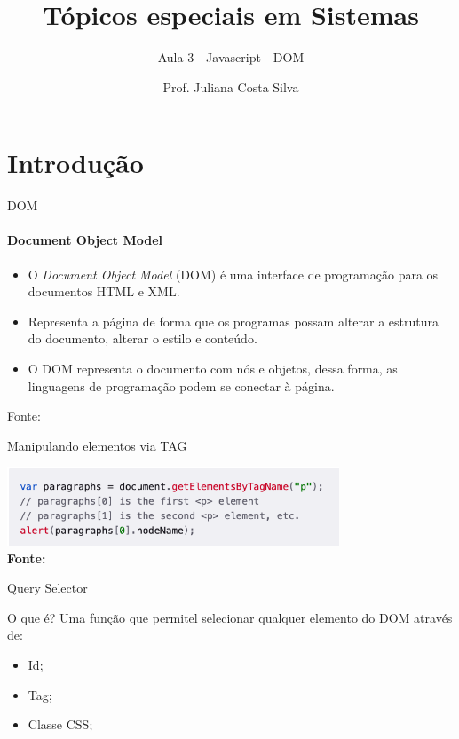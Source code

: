 \documentclass{beamer}
\title{Tópicos especiais em Sistemas}
\subtitle{Aula 3  - Javascript - DOM}
\author{Prof. Juliana Costa Silva}
\begin{document}
  \frame[c]{\maketitle}
    \section{Introdução}
    \begin{frame}{DOM}
      \framesubtitle{Document Object Model}%
      
      \begin{itemize}
            \item O \textit{Document Object Model} (DOM) é uma interface de programação para os documentos HTML e XML.
            \item Representa a página de forma que os programas possam alterar a estrutura do documento, alterar o estilo e conteúdo. 
            \item O DOM representa o documento com nós e objetos, dessa forma, as linguagens de programação podem se conectar à página.
       \end{itemize}
       \tiny{Fonte: \cite{moziladev2022}}
     \end{frame}
\begin{frame}{Manipulando elementos via TAG}
\begin{center}
    \includegraphics[width=99mm]{aulas/resources/aula3_js_1.png}\\        
    \tiny{\textbf{Fonte:} \cite{moziladev2022}}
\end{center}
\end{frame}
    \begin{frame}{Query Selector}

      \begin{block}{O que é?}
        Uma função que permitel selecionar qualquer elemento do DOM através de:
\begin{itemize}
    \item Id;
    \item Tag;
    \item Classe CSS;
\end{itemize}
      \end{block}
      
    \end{frame}
\end{document}

